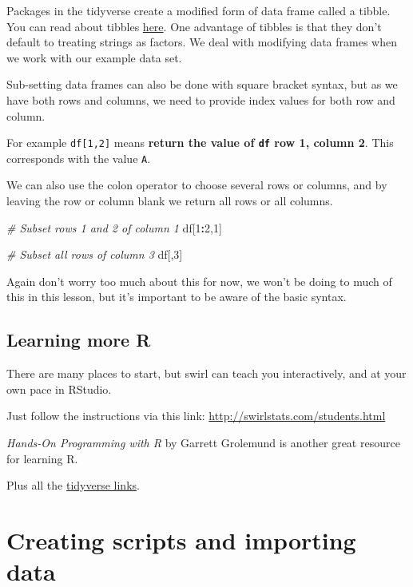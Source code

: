 \documentclass[12pt,]{book}
\newenvironment{Shaded}{\begin{snugshade}}{\end{snugshade}}
\newcommand{\CommentTok}[1]{\textcolor[rgb]{0.56,0.35,0.01}{\textit{#1}}}
\newcommand{\DecValTok}[1]{\textcolor[rgb]{0.00,0.00,0.81}{#1}}
\newcommand{\NormalTok}[1]{#1}
\newcommand{\OperatorTok}[1]{\textcolor[rgb]{0.81,0.36,0.00}{\textbf{#1}}}
\begin{document}
Packages in the tidyverse create a modified form of data frame called a tibble.
You can read about tibbles \href{http://r4ds.had.co.nz/tibbles.html}{here}. One
advantage of tibbles is that they don't default to treating strings as factors.
We deal with modifying data frames when we work with our example data set.

Sub-setting data frames can also be done with square bracket syntax, but as we
have both rows and columns, we need to provide index values for both row and
column.

For example \texttt{df{[}1,2{]}} means \textbf{return the value of \texttt{df} row 1, column 2}. This corresponds with the value \texttt{A}.

We can also use the colon operator to choose
several rows or columns, and by leaving the row or column blank we return all
rows or all columns.

\begin{Shaded}
\begin{Highlighting}[]
\CommentTok{# Subset rows 1 and 2 of column 1}
\NormalTok{df[}\DecValTok{1}\OperatorTok{:}\DecValTok{2}\NormalTok{,}\DecValTok{1}\NormalTok{]}

\CommentTok{# Subset all rows of column 3}
\NormalTok{df[,}\DecValTok{3}\NormalTok{]}
\end{Highlighting}
\end{Shaded}

Again don't worry too much about this for now, we won't be doing to much of this
in this lesson, but it's important to be aware of the basic syntax.

\hypertarget{learning-more-r}{%
\section{Learning more R}\label{learning-more-r}}

There are many places to start, but swirl can teach you interactively, and at your own pace in RStudio.

Just follow the instructions via this link: \url{http://swirlstats.com/students.html}

\emph{Hands-On Programming with R} by Garrett Grolemund is another great resource
for learning R.

Plus all the \href{https://www.tidyverse.org/learn/}{tidyverse links}.

\hypertarget{import}{%
\chapter{Creating scripts and importing data}\label{import}}
\end{document}
